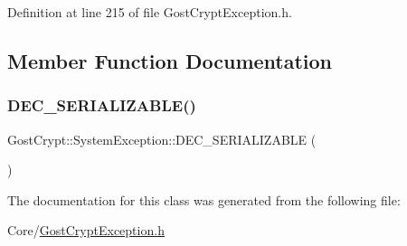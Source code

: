 Definition at line 215 of file Gost\+Crypt\+Exception.\+h.



\subsection{Member Function Documentation}
\mbox{\label{class_gost_crypt_1_1_system_exception_a5f7e152f04292aadf42f53f183bd56f3}} 
\subsubsection{\texorpdfstring{D\+E\+C\+\_\+\+S\+E\+R\+I\+A\+L\+I\+Z\+A\+B\+L\+E()}{DEC\_SERIALIZABLE()}}
{\footnotesize\ttfamily Gost\+Crypt\+::\+System\+Exception\+::\+D\+E\+C\+\_\+\+S\+E\+R\+I\+A\+L\+I\+Z\+A\+B\+LE (\begin{DoxyParamCaption}\item[{\hyperlink{class_gost_crypt_1_1_system_exception}{System\+Exception}}]{ }\end{DoxyParamCaption})}



The documentation for this class was generated from the following file\+:\begin{DoxyCompactItemize}
\item 
Core/\hyperlink{_gost_crypt_exception_8h}{Gost\+Crypt\+Exception.\+h}\end{DoxyCompactItemize}

